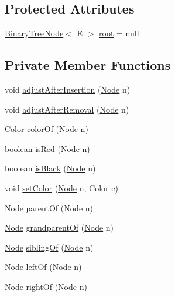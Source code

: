 \subsection*{Protected Attributes}
\begin{DoxyCompactItemize}
\item 
\hyperlink{interface_binary_tree_node}{Binary\+Tree\+Node}$<$ E $>$ \hyperlink{class_binary_search_tree_a5702657bf1d1f9d2bf0d6d9f19252735}{root} = null
\end{DoxyCompactItemize}
\subsection*{Private Member Functions}
\begin{DoxyCompactItemize}
\item 
void \hyperlink{class_red_black_tree_a036603602c44b39f5698d65e15bae390}{adjust\+After\+Insertion} (\hyperlink{class_red_black_tree_1_1_node}{Node} n)
\item 
void \hyperlink{class_red_black_tree_ae4c27d37bc5f50805fbe6c0cf360476c}{adjust\+After\+Removal} (\hyperlink{class_red_black_tree_1_1_node}{Node} n)
\item 
Color \hyperlink{class_red_black_tree_ae251b6377f66dc42714a8e005d8604b9}{color\+Of} (\hyperlink{class_red_black_tree_1_1_node}{Node} n)
\item 
boolean \hyperlink{class_red_black_tree_acaeb373bc18fa0cd3dbff1bd851f4c5b}{is\+Red} (\hyperlink{class_red_black_tree_1_1_node}{Node} n)
\item 
boolean \hyperlink{class_red_black_tree_a10fc9057a3791318d26ceffa8ddbc7c2}{is\+Black} (\hyperlink{class_red_black_tree_1_1_node}{Node} n)
\item 
void \hyperlink{class_red_black_tree_a88e7d0ae71ac8469d0b943fe9d3cc455}{set\+Color} (\hyperlink{class_red_black_tree_1_1_node}{Node} n, Color c)
\item 
\hyperlink{class_red_black_tree_1_1_node}{Node} \hyperlink{class_red_black_tree_a0e0446d903d1396d17ec40140008c0d9}{parent\+Of} (\hyperlink{class_red_black_tree_1_1_node}{Node} n)
\item 
\hyperlink{class_red_black_tree_1_1_node}{Node} \hyperlink{class_red_black_tree_a9ee7b2c519829be30a064de63fc0e584}{grandparent\+Of} (\hyperlink{class_red_black_tree_1_1_node}{Node} n)
\item 
\hyperlink{class_red_black_tree_1_1_node}{Node} \hyperlink{class_red_black_tree_a456b791db3dfd9eb29bd917db098dc75}{sibling\+Of} (\hyperlink{class_red_black_tree_1_1_node}{Node} n)
\item 
\hyperlink{class_red_black_tree_1_1_node}{Node} \hyperlink{class_red_black_tree_a59dc634a00db096b2bca448d4b2d48fd}{left\+Of} (\hyperlink{class_red_black_tree_1_1_node}{Node} n)
\item 
\hyperlink{class_red_black_tree_1_1_node}{Node} \hyperlink{class_red_black_tree_aac1f4f93040b9ad9e57120fbbfefd9df}{right\+Of} (\hyperlink{class_red_black_tree_1_1_node}{Node} n)
\end{DoxyCompactItemize}


